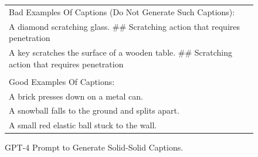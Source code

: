 \begin{figure}[htbp]
{\begin{tabular}{p{1.3\linewidth}}
Bad Examples Of Captions (Do Not Generate Such Captions):\\
A diamond scratching glass. \#\# Scratching action that requires penetration\\
A key scratches the surface of a wooden table. \#\# Scratching action that requires penetration\\\\

Good Examples Of Captions:\\
A brick presses down on a metal can.\\
A snowball falls to the ground and splits apart.\\
A small red elastic ball stuck to the wall.\\
\bottomrule
\end{tabular} }

\caption{GPT-4 Prompt to Generate Solid-Solid Captions.}
\label{tab:solid_solid_prompt}
\end{figure}


